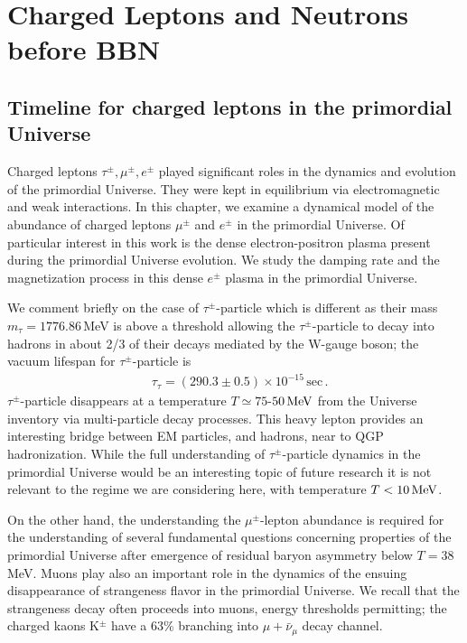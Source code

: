 \section{Charged Leptons and Neutrons before BBN} 
\subsection{Timeline for charged leptons in the primordial Universe}\label{Electron}
Charged leptons $\tau^\pm,\mu^\pm,e^\pm$ played significant roles in the dynamics and evolution of the primordial Universe. They were kept in equilibrium via electromagnetic and weak interactions. In this chapter, we examine a dynamical model of the abundance of charged leptons $\mu^\pm$ and $e^\pm$ in the primordial Universe. Of particular interest in this work is the dense electron-positron plasma present during the primordial Universe evolution. We study the damping rate and the magnetization process in this dense $e^\pm$ plasma in the primordial Universe.

We comment briefly on the case of $\tau^\pm$-particle which is different as their mass $m_\tau=1776.86$\,MeV is above a threshold allowing the $\tau^\pm$-particle to decay into hadrons in about 2/3 of their decays mediated by the W-gauge boson; the vacuum lifespan for $\tau^\pm$-particle is~\cite{ParticleDataGroup:2022pth}
\begin{align}
&\tau_{\tau}=(290.3\pm0.5)\times10^{-15}\,\mathrm{sec}\,.
\end{align}
$\tau^\pm$-particle disappears at a temperature $T\simeq 75$-$50\text{\,MeV}$ from the Universe inventory via multi-particle decay processes. This heavy lepton provides an interesting bridge between EM particles, and hadrons, near to QGP hadronization. While the full understanding of $\tau^\pm$-particle dynamics in the primordial Universe would be an interesting topic of future research it is not relevant to the regime we are considering here, with temperature $T<10\text{\,MeV}$. 

On the other hand, the understanding the $\mu^\pm$-lepton abundance is required for the understanding of several fundamental questions concerning properties of the primordial Universe after emergence of residual baryon asymmetry below $T=38$\,MeV. Muons play also an important role in the dynamics of the ensuing disappearance of strangeness flavor in the primordial Universe. We recall that the strangeness decay often proceeds into muons, energy thresholds permitting; the charged kaons K$^\pm$ have a 63\% branching into $\mu+\bar \nu_\mu$ decay channel. 

